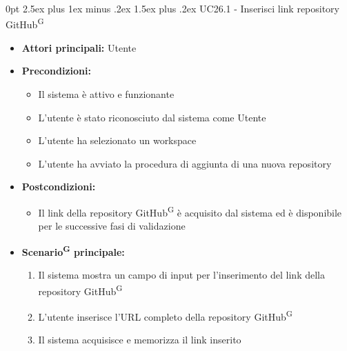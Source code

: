 \documentclass[a4paper, 11pt]{article}
\makeatletter
\renewcommand\paragraph{\@startsection{paragraph}{4}
  {0pt}
  {2.5ex plus 1ex minus .2ex}
  {1.5ex plus .2ex}
  {\normalfont\normalsize\bfseries\color{AccentDark}}}
\makeatother
\begin{document}
\paragraph{UC26.1 - Inserisci link repository GitHub\textsuperscript{G}}\label{UC26.1}
\begin{itemize}
	\item \textbf{Attori principali:} Utente
	\item \textbf{Precondizioni:} 
	\begin{itemize}
		\item Il sistema è attivo e funzionante
		\item L'utente è stato riconosciuto dal sistema come Utente
		\item L'utente ha selezionato un workspace
		\item L'utente ha avviato la procedura di aggiunta di una nuova repository
	\end{itemize}
	\item \textbf{Postcondizioni:} 
	\begin{itemize}
		\item Il link della repository GitHub\textsuperscript{G} è acquisito dal sistema ed è disponibile per le successive fasi di validazione
	\end{itemize}
	\item \textbf{Scenario\textsuperscript{G} principale:}
	\begin{enumerate}
		\item Il sistema mostra un campo di input per l'inserimento del link della repository GitHub\textsuperscript{G}
		\item L'utente inserisce l'URL completo della repository GitHub\textsuperscript{G}
		\item Il sistema acquisisce e memorizza il link inserito
	\end{enumerate}
\end{itemize}
\end{document}
